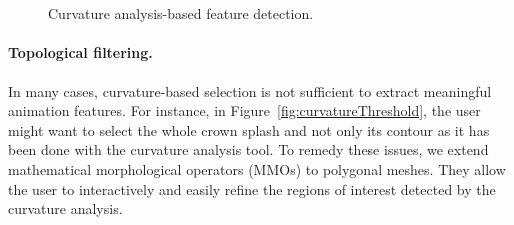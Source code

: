 \documentclass[review]{acmsiggraph}
\begin{document}
\begin{figure}[t]
\centering
{}
~
\\
~
\caption{Curvature analysis-based feature detection.}
\label{fig:curvature_analysis}
\end{figure}

\paragraph*{Topological filtering.}
In many cases, curvature-based selection is not sufficient to extract meaningful animation features. 
For instance, in Figure~\ref{fig:curvatureThreshold}, the user might want to select the whole crown splash and not only its contour as it has been done with the curvature analysis tool. 
To remedy these issues, we extend mathematical morphological operators (MMOs) to polygonal meshes.
They allow the user to interactively and easily refine the regions of interest detected by the curvature analysis.
\end{document}
